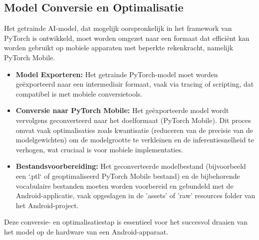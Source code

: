 \subsection{Model Conversie en Optimalisatie}
\label{subsec:model-conversie}

Het getrainde AI-model, dat mogelijk oorspronkelijk in het framework van PyTorch is ontwikkeld, moet worden omgezet naar een formaat dat efficiënt kan worden gebruikt op mobiele apparaten met beperkte rekenkracht, namelijk PyTorch Mobile.
\begin{itemize}
    \item \textbf{Model Exporteren:} Het getrainde PyTorch-model moet worden geëxporteerd naar een intermediair formaat, vaak via tracing of scripting, dat compatibel is met mobiele conversietools.
    \item \textbf{Conversie naar PyTorch Mobile:} Het geëxporteerde model wordt vervolgens geconverteerd naar het doelformaat (PyTorch Mobile). 
    Dit proces omvat vaak optimalisaties zoals kwantisatie (reduceren van de precisie van de modelgewichten) om de modelgrootte te verkleinen en de inferentiesnelheid te verhogen, wat cruciaal is voor mobiele implementaties.
    \item \textbf{Bestandsvoorbereiding:} Het geconverteerde modelbestand (bijvoorbeeld een `.ptl` of geoptimaliseerd PyTorch Mobile bestand) en de bijbehorende vocabulaire bestanden moeten worden voorbereid en gebundeld met de Android-applicatie, vaak opgeslagen in de 'assets' of 'raw' resources folder van het Android-project.
\end{itemize}
Deze conversie- en optimalisatiestap is essentieel voor het succesvol draaien van het model op de hardware van een Android-apparaat.
